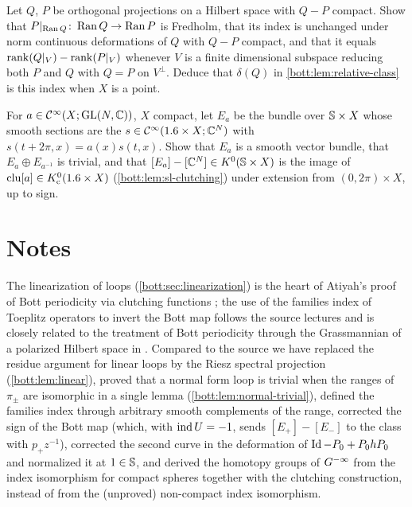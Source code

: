 \begin{exercise}\label{bott:ex:relative-dimension}
  Let $Q$, $P$ be orthogonal projections on a Hilbert space with $Q-P$ compact. Show that
  $P|_{\operatorname{Ran} Q}\colon\operatorname{Ran} Q\to\operatorname{Ran} P$ is Fredholm, that its index is unchanged under norm
  continuous deformations of $Q$ with $Q-P$ compact, and that it equals
  $\operatorname{rank}(Q|_V)-\operatorname{rank}(P|_V)$ whenever $V$ is a finite dimensional subspace reducing both $P$
  and $Q$ with $Q=P$ on $V^\perp$. Deduce that $\delta(Q)$ in \cref{bott:lem:relative-class} is
  this index when $X$ is a point.
\end{exercise}

\begin{exercise}\label{bott:ex:clutched-bundle}
  For $a\in\mathcal{C}^\infty(X;\operatorname{GL}(N,\mathbb{C}))$, $X$ compact, let $E_a$ be the bundle over $\mathbb{S}\times X$ whose
  smooth sections are the $s\in\mathcal{C}^\infty(1.6\times X;\mathbb{C}^N)$ with $s(t+2\pi,x)=a(x)s(t,x)$. Show that
  $E_a$ is a smooth vector bundle, that $E_a\oplus E_{a^{-1}}$ is trivial, and that
  $[E_a]-[\mathbb{C}^N]\in K^0(\mathbb{S}\times X)$ is the image of $\operatorname{clu}[a]\in K_{\mathrm{c}}^0(1.6\times X)$
  (\cref{bott:lem:sl-clutching}) under extension from $(0,2\pi)\times X$, up to sign.
\end{exercise}

\section*{Notes}
The linearization of loops (\cref{bott:sec:linearization}) is the heart of Atiyah's
proof of Bott periodicity via clutching functions \cite{Atiyah-K}; the use of the families index
of Toeplitz operators to invert the Bott map follows the source lectures and is closely related to
the treatment of Bott periodicity through the Grassmannian of a polarized Hilbert space in
\cite{Pressley-Segal}. Compared to the source we have replaced the residue argument for linear
loops by the Riesz spectral projection (\cref{bott:lem:linear}), proved that a normal form loop is
trivial when the ranges of $\pi_\pm$ are isomorphic in a single lemma
(\cref{bott:lem:normal-trivial}), defined the families index through arbitrary smooth complements
of the range, corrected the sign of the Bott map (which, with $\operatorname{ind} U=-1$, sends
$[E_+]-[E_-]$ to the class with $p_+z^{-1}$), corrected the second curve in the deformation of
$\operatorname{Id}-P_0+P_0hP_0$ and normalized it at $1\in\mathbb{S}$, and derived the homotopy groups of $G^{-\infty}$
from the index isomorphism for compact spheres together with the clutching construction, instead
of from the (unproved) non-compact index isomorphism.

